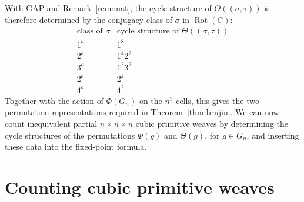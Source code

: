 \documentclass[12pt]{article}
\theoremstyle{definition}
\theoremstyle{remark}
\DeclareMathOperator{\Rot}{Rot}
\begin{document}
With GAP and Remark~\ref{rem:mat}, the cycle structure of $\Theta((\sigma,\tau))$ is therefore determined by the conjugacy class of $\sigma$ in $\Rot(C)$:
\[
\begin{array}{c|c}
\text{class of }\sigma & \text{cycle structure of }\Theta((\sigma,\tau))\\
\hline
1^a & 1^8\\
2^a & 1^4 2^2\\
3^a & 1^2 3^2\\
2^b & 2^4\\
4^a & 4^2
\end{array}
\]
Together with the action of $\Phi(G_n)$ on the $n^3$ cells, this gives the two permutation representations required in Theorem~\ref{thm:brujin}. We can now count inequivalent partial $n\times n\times n$ cubic primitive weaves by determining the cycle structures of the permutations $\Phi(g)$ and $\Theta(g)$, for $g\in G_n$, and inserting these data into the fixed-point formula.




\section{Counting cubic primitive weaves}
\label{counting}
\end{document}
